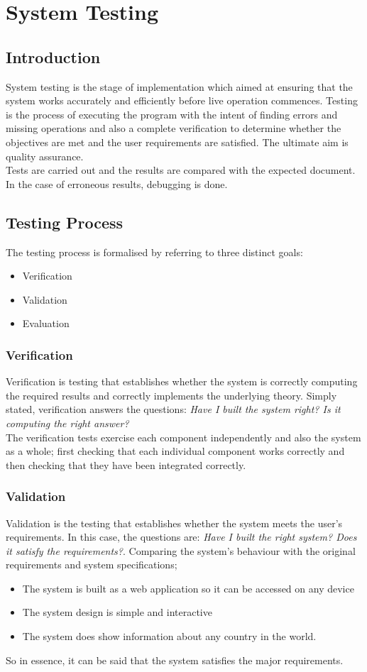 \documentclass[twoside, a4paper, 12pt]{report}
\begin{document}
\chapter{System Testing}
\section{Introduction}
System testing is the stage of implementation which aimed at ensuring that the system works accurately and efficiently before live operation commences. Testing is the process of executing the program with the intent of finding errors and missing operations and also a complete verification to determine whether the objectives are met and the user requirements are satisfied. The ultimate aim is quality assurance.\\
\indent
Tests are carried out and the results are compared with the expected document. In the case of erroneous results, debugging is done.

\section{Testing Process}
The testing process is formalised by referring to three distinct goals:
\begin{itemize}
	\item Verification
	\item Validation
	\item Evaluation
\end{itemize}

\subsection{Verification}
Verification is testing that establishes whether the system is correctly computing the required results and correctly implements the underlying theory. Simply stated, verification answers the questions: \emph{Have I built the system right? Is it computing the right answer?}\\
\indent
The verification tests exercise each component independently and also the system as a whole; first checking that each individual component works correctly and then checking that they have been integrated correctly.

\subsection{Validation}
Validation is the testing that establishes whether the system meets the user’s requirements. In this case, the questions are: \emph{Have I built the right system? Does it satisfy the requirements?}. Comparing the system's behaviour with the original requirements and system specifications;
\begin{itemize}
	\item The system is built as a web application so it can be accessed on any device
	\item The system design is simple and interactive
	\item The system does show information about any country in the world.
\end{itemize}
So in essence, it can be said that the system satisfies the major requirements.
\end{document}
